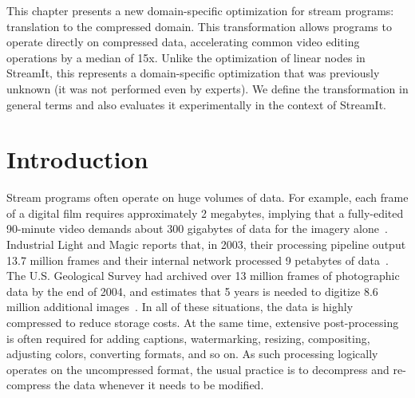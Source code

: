 
\label{chap:compression}


This chapter presents a new domain-specific optimization for stream
programs: translation to the compressed domain.  This transformation
allows programs to operate directly on compressed data, accelerating
common video editing operations by a median of 15x.  Unlike the
optimization of linear nodes in StreamIt, this represents a
domain-specific optimization that was previously unknown (it was not
performed even by experts).  We define the transformation in general
terms and also evaluates it experimentally in the context of StreamIt.

\section{Introduction}

Stream programs often operate on huge volumes of data.  For example,
each frame of a digital film requires approximately 2 megabytes,
implying that a fully-edited 90-minute video demands about 300
gigabytes of data for the imagery alone~\cite{ibm-video}.  Industrial
Light and Magic reports that, in 2003, their processing pipeline
output 13.7 million frames and their internal network processed 9
petabytes of data~\cite{ilm-interview}.  The U.S. Geological Survey
had archived over 13 million frames of photographic data by the end of
2004, and estimates that 5 years is needed to digitize 8.6 million
additional images~\cite{usgs}.  In all of these situations, the data
is highly compressed to reduce storage costs.  At the same time,
extensive post-processing is often required for adding captions,
watermarking, resizing, compositing, adjusting colors, converting
formats, and so on.  As such processing logically operates on the
uncompressed format, the usual practice is to decompress and
re-compress the data whenever it needs to be modified.

